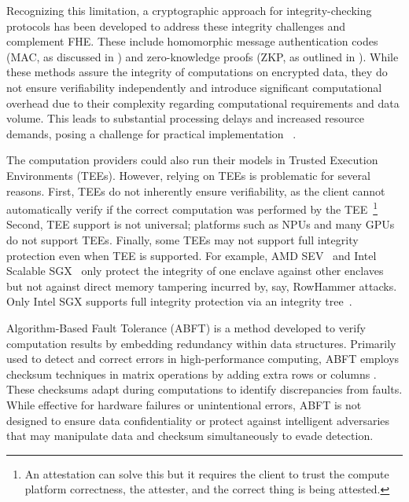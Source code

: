 Recognizing this limitation, a cryptographic approach for integrity-checking protocols has been developed to address these integrity challenges and complement FHE. These include homomorphic message authentication codes (MAC, as discussed in \cite{chatel2022verifiable}) and zero-knowledge proofs (ZKP, as outlined in \cite{viand2023verifiable}). While these methods assure the integrity of computations on encrypted data, they do not ensure verifiability independently and introduce significant computational overhead due to their complexity regarding computational requirements and data volume. This leads to substantial processing delays and increased resource demands, posing a challenge for practical implementation ~\cite{bhadauria2020ligero++, bunz2018bulletproofs, gennaro2010non, goldwasser2015delegating, parno2016pinocchio, weng2021wolverine, brakerski2011fully, bois2021flexible, fiore2014efficiently, fiore2020boosting, ganesh2021rinocchio}.

The computation providers could also run their models in Trusted Execution Environments (TEEs). However, relying on TEEs is problematic for several reasons. First, TEEs do not inherently ensure verifiability, as the client cannot automatically verify if the correct computation was performed by the TEE~\footnote{An attestation can solve this but it requires the client to trust the compute platform correctness, the attester, and the correct thing is being attested.}  Second, TEE support is not universal; platforms such as NPUs and many GPUs do not support TEEs. Finally, some TEEs may not support full integrity protection even when TEE is supported. For example, AMD SEV~\cite{AMD_SEV} and Intel Scalable SGX~\cite{Intel_SGX} only protect the integrity of one enclave against other enclaves but not against direct memory tampering incurred by, say, RowHammer attacks. Only Intel SGX supports full integrity protection via an integrity tree~\cite{intel2021sgx}. 

Algorithm-Based Fault Tolerance (ABFT) is a method developed to verify computation results by embedding redundancy within data structures. Primarily used to detect and correct errors in high-performance computing, ABFT employs checksum techniques in matrix operations by adding extra rows or columns \cite{abft,abft1,abft2,ABFT-1984-checksum}. These checksums adapt during computations to identify discrepancies from faults. While effective for hardware failures or unintentional errors, ABFT is not designed to ensure data confidentiality or protect against intelligent adversaries that may manipulate data and checksum simultaneously to evade detection. 

